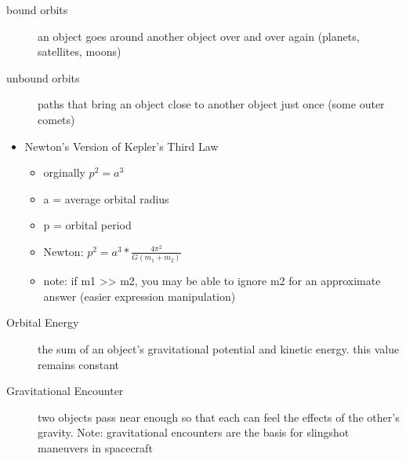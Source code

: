 \documentclass[12pt]{article}
\begin{document}
\begin{description}
\item[bound orbits] an object goes around another object over and over again (planets, satellites, moons)
\item[unbound orbits] paths that bring an object close to another object just once (some outer comets)
\end{description}


\begin{itemize}
\item Newton's Version of Kepler's Third Law
\begin{itemize}
\item orginally $p^2 = a^3$
\item a = average orbital radius
\item p = orbital period
\item Newton: $p^2 = a^3 * \frac{4\pi^2}{G(m_1 + m_2)}$
\item note: if m1 >> m2, you may be able to ignore m2 for an approximate answer (easier expression manipulation)
\end{itemize}
\end{itemize}

\begin{description}
\item[Orbital Energy] the sum of an object's gravitational potential and kinetic energy. this value remains constant
\item[Gravitational Encounter] two objects pass near enough so that each can feel the effects of the other’s gravity. Note: gravitational encounters are the basis for slingshot maneuvers in spacecraft
\end{description}
\end{document}

